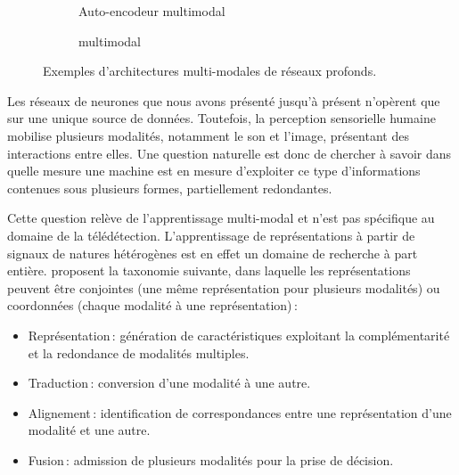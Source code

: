 \begin{figure}[h]
  \hfill
  \begin{subfigure}[b]{0.43\textwidth}
    \resizebox{\textwidth}{!}{
      
    }
    \caption{Auto-encodeur multimodal~\cite{ngiam_multimodal_2011}}
    \label{fig:ae_multimodal}
  \end{subfigure}%
  \hfill
  \begin{subfigure}[b]{0.53\textwidth}
    \resizebox{\textwidth}{!}{
      
    }
    \caption{ multimodal~\cite{eitel_multimodal_2015}}
    \label{fig:cnn_multimodal}
  \end{subfigure}
  \hfill
  \caption{Exemples d'architectures multi-modales de réseaux profonds.}
  \label{fig:deep_multimodal}
\end{figure}

Les réseaux de neurones que nous avons présenté jusqu'à présent n'opèrent que sur une unique source de données. Toutefois, la perception sensorielle humaine mobilise plusieurs modalités, notamment le son et l'image, présentant des interactions entre elles. Une question naturelle est donc de chercher à savoir dans quelle mesure une machine est en mesure d'exploiter ce type d'informations contenues sous plusieurs formes, partiellement redondantes.

Cette question relève de l'apprentissage multi-modal et n'est pas spécifique au domaine de la télédétection. L'apprentissage de représentations à partir de signaux de natures hétérogènes est en effet un domaine de recherche à part entière. \citet{baltrusaitis_multimodal_2017} proposent la taxonomie suivante, dans laquelle les représentations peuvent être conjointes (une même représentation pour plusieurs modalités) ou coordonnées (chaque modalité à une représentation)\,:
\begin{itemize}
    \item Représentation\,: génération de caractéristiques exploitant la complémentarité et la redondance de modalités multiples.
    \item Traduction\,: conversion d'une modalité à une autre.
    \item Alignement\,: identification de correspondances entre une représentation d'une modalité et une autre.
    \item Fusion\,: admission de plusieurs modalités pour la prise de décision.
\end{itemize}

